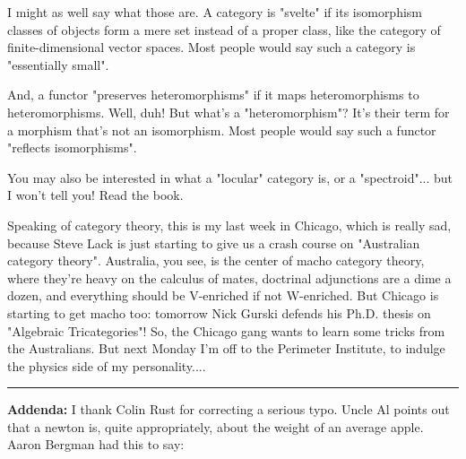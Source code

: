 I might as well say what those are.  A category is "svelte"
if its isomorphism classes of objects form a mere set instead of a
proper class, like the category of finite-dimensional vector spaces.
Most people would say such a category is "essentially
small".

And, a functor "preserves heteromorphisms" if it maps
heteromorphisms to heteromorphisms.  Well, duh!  But what's a
"heteromorphism"?  It's their term for a morphism that's not
an isomorphism.  Most people would say such a functor "reflects
isomorphisms".

You may also be interested in what a "locular" category is,
or a "spectroid"... but I won't tell you!  Read the book.

Speaking of category theory, this is my last week in Chicago, which
is really sad, because Steve Lack is just starting to give us a
crash course on "Australian category theory".  Australia, 
you see, is the center of macho category theory, where 
they're heavy on the calculus of mates,
doctrinal adjunctions are a dime a dozen, and everything should be
V-enriched if not W-enriched.  But
Chicago is starting to get macho too: tomorrow Nick Gurski defends
his Ph.D. thesis on "Algebraic Tricategories"!    So, the Chicago
gang wants to learn some tricks from the Australians.  But next
Monday I'm off to the Perimeter Institute, to indulge the physics
side of my personality....

\par\noindent\rule{\textwidth}{0.4pt}
\textbf{Addenda:} 
I thank Colin Rust for correcting a serious typo.  Uncle Al
points out that a newton is, quite appropriately, about the weight 
of an average apple.  Aaron Bergman had this to say:



